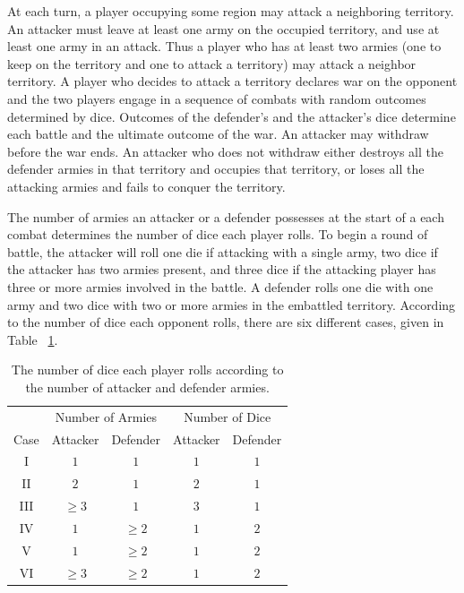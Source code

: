 \documentclass[12pt]{article}
\begin{document}
At each turn, a player occupying some region may attack a neighboring
territory.  An attacker must leave at least one army on the occupied
territory, and use at least one army in an attack.  Thus a player who
has at least two armies (one to keep on the territory and one to attack
a territory) may attack a neighbor territory.  A player who decides to
attack a territory declares war on the opponent and the two players
engage in a sequence of combats with random outcomes determined by dice.
Outcomes of the defender's and the attacker's dice determine each battle
and the ultimate outcome of the war.  An attacker may withdraw before
the war ends.  An attacker who does not withdraw either destroys all the
defender armies in that territory and occupies that territory, or loses
all the attacking armies and fails to conquer the territory.

The number of armies an attacker or a defender possesses at the start of
a each combat determines the number of dice each player rolls.  To begin
a round of battle, the attacker will roll one die if attacking with a
single army, two dice if the attacker has two armies present, and three
dice if the attacking player has three or more armies involved in the
battle.  A defender rolls one die with one army and two dice with two or
more armies in the embattled territory.  According to the number of dice
each opponent rolls, there are six different cases, given in Table~%
\ref{tab:games:riskdice}.

\begin{table}
    \centering
    \begin{tabular}{ccccc}
             & \multicolumn{2}{c}{Number of Armies} & \multicolumn{2}{c}{Number of Dice} \\ 
        Case & Attacker & Defender & Attacker & Defender \\ 
        I    & $1$      & $1$      & $1$      & $1$      \\ 
        II   & $2$      & $1$      & $2$      & $1$      \\ 
        III  & $ \ge 3$ & $1$      & 3        & $1$      \\ 
        IV   & $1$      & $ \ge 2$ & $1$      & $2$      \\ 
        V    & $1$      & $ \ge 2$ & $1$      & $2$      \\ 
        VI   & $ \ge 3$ & $ \ge 2$ & $1$      & $2$      \\ 
    \end{tabular}
    \caption{The number of dice each player rolls according to the
    number of attacker and defender armies.}%
    \label{tab:games:riskdice}
\end{table}
\end{document}
